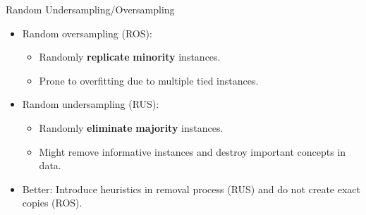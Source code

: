 \documentclass[11pt,compress,t,notes=noshow, xcolor=table]{beamer}
\begin{document}
\begin{frame}{Random Undersampling/Oversampling}

    \begin{itemize}
        \item Random oversampling (ROS):
        \begin{itemize}
            \item Randomly \textbf{replicate} \textbf{minority} instances.%
            \item Prone to overfitting due to multiple tied instances.
        \end{itemize}

        \item Random undersampling (RUS):
        \begin{itemize}
            \item Randomly \textbf{eliminate} \textbf{majority} instances. %
            \item Might remove informative instances and destroy important concepts in data.
        \end{itemize}

        \item Better: Introduce heuristics in removal process (RUS) and do not create exact copies (ROS).
    
        \end{itemize}	

\end{frame}
	
\end{document}
